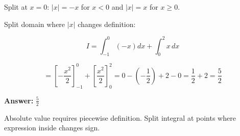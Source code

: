 \begin{hint}
Split at $x=0$: $|x| = -x$ for $x<0$ and $|x| = x$ for $x \ge 0$.
\end{hint}

\begin{solution}
Split domain where $|x|$ changes definition:

\[
I = \int_{-1}^0 (-x) dx + \int_0^2 x \, dx
\]

\[
= \left[-\frac{x^2}{2}\right]_{-1}^0 + \left[\frac{x^2}{2}\right]_0^2 = 0 - \left(-\frac{1}{2}\right) + 2 - 0 = \frac{1}{2} + 2 = \frac{5}{2}
\]

\textbf{Answer:} $\boxed{\frac{5}{2}}$
\end{solution}

\begin{takeaways}
Absolute value requires piecewise definition. Split integral at points where expression inside changes sign.
\end{takeaways}
